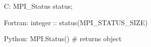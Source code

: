 C:
MPI_Status status;

Fortran:
integer :: status(MPI_STATUS_SIZE)

Python:
MPI.Status() # returns object


